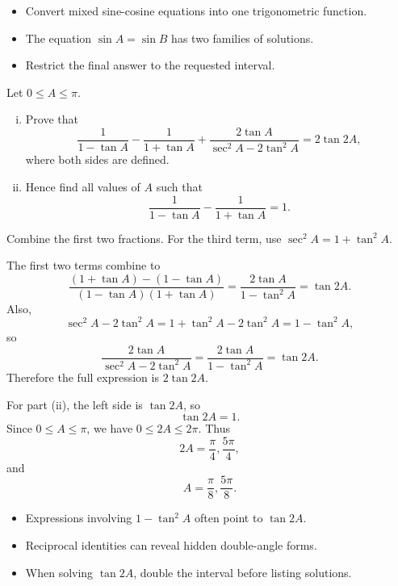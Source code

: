 \begin{takeaways}
\begin{itemize}[leftmargin=*]
  \item Convert mixed sine-cosine equations into one trigonometric function.
  \item The equation $\sin A=\sin B$ has two families of solutions.
  \item Restrict the final answer to the requested interval.
\end{itemize}
\end{takeaways}

\begin{problem}
Let $0\le A\le\pi$.
\begin{enumerate}[(i)]
  \item Prove that
  \[
  \frac{1}{1-\tan A}
  -
  \frac{1}{1+\tan A}
  +
  \frac{2\tan A}{\sec^2A-2\tan^2A}
  =
  2\tan2A,
  \]
  where both sides are defined.
  \item Hence find all values of $A$ such that
  \[
  \frac{1}{1-\tan A}
  -
  \frac{1}{1+\tan A}
  =1.
  \]
\end{enumerate}
\end{problem}

\begin{hintbox}
Combine the first two fractions. For the third term, use
$\sec^2A=1+\tan^2A$.
\end{hintbox}

\begin{solution}
The first two terms combine to
\[
\frac{(1+\tan A)-(1-\tan A)}{(1-\tan A)(1+\tan A)}
=
\frac{2\tan A}{1-\tan^2A}
=\tan2A.
\]
Also,
\[
\sec^2A-2\tan^2A
=1+\tan^2A-2\tan^2A
=1-\tan^2A,
\]
so
\[
\frac{2\tan A}{\sec^2A-2\tan^2A}
=
\frac{2\tan A}{1-\tan^2A}
=\tan2A.
\]
Therefore the full expression is $2\tan2A$.

For part (ii), the left side is $\tan2A$, so
\[
\tan2A=1.
\]
Since $0\le A\le\pi$, we have $0\le2A\le2\pi$. Thus
\[
2A=\frac{\pi}{4},\frac{5\pi}{4},
\]
and
\[
A=\frac{\pi}{8},\frac{5\pi}{8}.
\]
\end{solution}

\begin{takeaways}
\begin{itemize}[leftmargin=*]
  \item Expressions involving $1-\tan^2A$ often point to $\tan2A$.
  \item Reciprocal identities can reveal hidden double-angle forms.
  \item When solving $\tan2A$, double the interval before listing solutions.
\end{itemize}
\end{takeaways}


